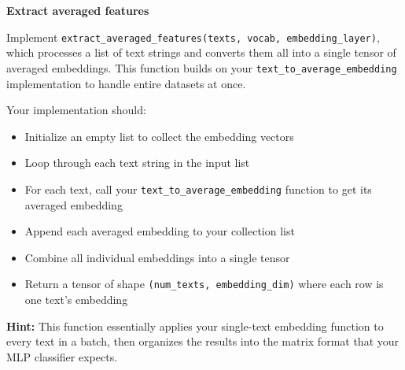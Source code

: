 \item {} \textbf{Extract averaged features}

Implement \texttt{extract\_averaged\_features(texts, vocab, embedding\_layer)},
which processes a list of text strings and converts them all into a single tensor of averaged embeddings. This function
builds on your \texttt{text\_to\_average\_embedding} implementation to handle entire datasets at once.

Your implementation should:
\begin{itemize}
    \item Initialize an empty list to collect the embedding vectors
    \item Loop through each text string in the input list
    \item For each text, call your \texttt{text\_to\_average\_embedding} function to get its averaged embedding
    \item Append each averaged embedding to your collection list
    \item Combine all individual embeddings into a single tensor
    \item Return a tensor of shape \texttt{(num\_texts, embedding\_dim)} where each row is one text's embedding
\end{itemize}

\textbf{Hint:} This function essentially applies your single-text embedding function to every text in a batch,
then organizes the results into the matrix format that your MLP classifier expects.